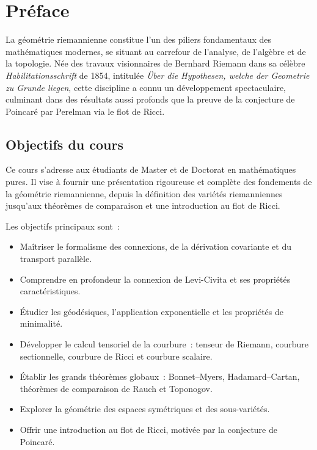 \chapter*{Pr\'eface}

La g\'eom\'etrie riemannienne constitue l'un des piliers fondamentaux des math\'ematiques
modernes, se situant au carrefour de l'analyse, de l'alg\`ebre et de la topologie.
N\'ee des travaux visionnaires de Bernhard Riemann dans sa c\'el\`ebre \emph{Habilitationsschrift}
de 1854, intitul\'ee \emph{\"Uber die Hypothesen, welche der Geometrie zu Grunde liegen},
cette discipline a connu un d\'eveloppement spectaculaire, culminant dans des r\'esultats
aussi profonds que la preuve de la conjecture de Poincar\'e par Perelman via le flot de Ricci.

\section*{Objectifs du cours}

Ce cours s'adresse aux \'etudiants de Master et de Doctorat en math\'ematiques
pures. Il vise \`a fournir une pr\'esentation rigoureuse et compl\`ete des fondements
de la g\'eom\'etrie riemannienne, depuis la d\'efinition des vari\'et\'es riemanniennes
jusqu'aux th\'eor\`emes de comparaison et une introduction au flot de Ricci.

Les objectifs principaux sont~:
\begin{itemize}
    \item Ma\^itriser le formalisme des connexions, de la d\'erivation covariante
          et du transport parall\`ele.
    \item Comprendre en profondeur la connexion de Levi-Civita et ses propri\'et\'es
          caract\'eristiques.
    \item \'Etudier les g\'eod\'esiques, l'application exponentielle et les propri\'et\'es
          de minimalit\'e.
    \item D\'evelopper le calcul tensoriel de la courbure~: tenseur de Riemann,
          courbure sectionnelle, courbure de Ricci et courbure scalaire.
    \item \'Etablir les grands th\'eor\`emes globaux~: Bonnet--Myers, Hadamard--Cartan,
          th\'eor\`emes de comparaison de Rauch et Toponogov.
    \item Explorer la g\'eom\'etrie des espaces sym\'etriques et des sous-vari\'et\'es.
    \item Offrir une introduction au flot de Ricci, motiv\'ee par la conjecture
          de Poincar\'e.
\end{itemize}

